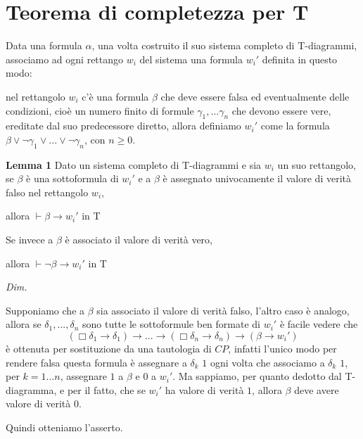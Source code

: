 \documentclass[a4paper, titlepage, 12pt]{report}
\begin{document}
\section{Teorema di completezza per T}
Data una formula $\alpha$, una volta costruito il suo sistema completo di T-diagrammi,
associamo ad ogni rettango $w_i$ del sistema una formula $w_i'$ definita in questo modo:

nel rettangolo $w_i$ c'è una formula $\beta$ che deve essere falsa ed eventualmente delle condizioni,
cioè un numero finito di formule $\gamma_1, ...\gamma_n$ che devono essere vere, ereditate
dal suo predecessore diretto, allora definiamo $w_i'$ come la formula
$\beta \lor \neg \gamma_1 \lor ... \lor \neg \gamma_n$, con $n \geq 0$.

\begin{flushleft}
\textbf{Lemma 1}
Dato un sistema completo di T-diagrammi e sia $w_i$ un suo rettangolo,
se $\beta$ è una sottoformula di $w_i'$ e a $\beta$ è assegnato univocamente il valore di verità falso
nel rettangolo $w_i$,

allora $\vdash \beta \rightarrow w_i'$ in T

Se invece a $\beta$ è associato il valore di verità vero,


allora $\vdash \neg \beta \rightarrow w_i'$ in T

\textit{Dim.}

Supponiamo che a $\beta$ sia associato il valore di verità falso, l'altro caso è analogo,
allora se $\delta_1, ..., \delta_n$ sono tutte le sottoformule ben formate di $w_i'$ è
facile vedere che
$$(\Box \delta_1 \rightarrow \delta_1) \rightarrow ... \rightarrow (\Box \delta_n \rightarrow \delta_n) \rightarrow (\beta \rightarrow w_i')$$
è ottenuta per sostituzione da una tautologia di $CP$, infatti l'unico modo per rendere
falsa questa formula è assegnare a $\delta_k$ $1$ ogni volta che associamo a $\delta_k$ $1$,
per $k = 1 ... n$, assegnare $1$ a $\beta$ e $0$ a $w_i'$.
Ma sappiamo, per quanto dedotto dal T-diagramma, e per il fatto,
che se $w_i'$ ha valore di verità $1$,
allora $\beta$ deve avere valore di verità $0$.

Quindi otteniamo l'asserto.

\end{flushleft}
\end{document}
